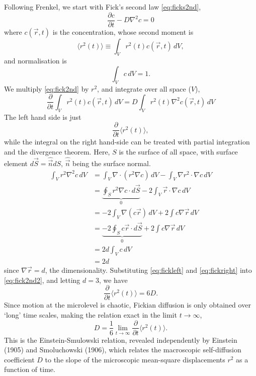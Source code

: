 \documentclass[11pt,bibliography=totoc,index=totoc]{scrbook}   %
\begin{document}
Following Frenkel\cite[78-79]{Frenkel:1996}, we start with Fick's second law \eqref{eq:ficks2nd}, 
\begin{equation}
    \frac{\partial c}{\partial t} - D\nabla^2c = 0
  \label{eq:fick2nd}
\end{equation}
where $c(\vec{r},t)$ is the concentration, whose second moment is
\begin{equation}
    \langle r^2(t)\rangle \equiv \int_V r^2(t) c(\vec{r},t) \,dV,
  \label{eq:secondmom}
\end{equation}
and normalisation is
\begin{equation}
    \int_V c\,dV = 1.
  \label{eq:cnorm}
\end{equation}
We multiply \eqref{eq:fick2nd} by $r^2$, and integrate over all space ($V$),
\begin{equation}
    \frac{\partial}{\partial t} \int_V r^2(t) c(\vec{r},t)\,dV = D\int_V r^2(t) \nabla^2 c(\vec{r},t) \,dV
  \label{eq:fick2nd2}
\end{equation}
The left hand side is just
\begin{equation}
  \frac{\partial}{\partial t} \langle r^2(t)\rangle,
  \label{eq:fickleft}
\end{equation}
while the integral on the right hand-side can be treated with partial integration and the divergence theorem.
Here, $S$ is the surface of all space, with surface element $d\vec{S}=\hat{\vec{n}}dS$, $\hat{\vec{n}}$ being the surface normal.
\begin{align}
  \int_V r^2 \nabla^2 c \,dV &= \int_V \nabla\cdot (r^2\nabla c) \,dV - \int_V \nabla r^2 \cdot \nabla c \, dV \nonumber\\
  &= \underbrace{\oint_S r^2 \nabla c \cdot d\vec{S}}_0 - 2\int_V \vec{r}\cdot\nabla c \,dV \nonumber\\
  &= -2\int_V \nabla (c\vec{r}) \,dV + 2 \int c \nabla \vec{r} \, dV \nonumber\\
  &= \underbrace{-2\oint_S c\vec{r}\cdot d\vec{S}}_0 + 2 \int c \nabla \vec{r} \, dV \nonumber\\
  &= 2d\int_V c \, dV \nonumber\\
  &= 2d \label{eq:fickright}
\end{align}
since $\nabla\vec{r} = d$, the dimensionality. 
Substituting \eqref{eq:fickleft} and \eqref{eq:fickright} into \eqref{eq:fick2nd2}, and letting $d=3$, we have
\begin{equation}
  \frac{\partial}{\partial t} \langle r^2(t)\rangle = 6D.
\end{equation}
Since motion at the microlevel is chaotic, Fickian diffusion is only obtained over `long' time scales, 
making the relation exact in the limit $t\to\infty$,
\begin{equation}
    D = \frac{1}{6}\lim_{t\to\infty} \frac{\partial}{\partial t} \langle r^2(t)\rangle.
\end{equation}
This is the Einstein-Smulowski relation, revealed independently by Einstein (1905)\cite{Einstein:1905}
and Smoluchowski (1906),\cite{Smoluchowski:1906}
which relates the macroscopic self-diffusion coefficient $D$ to the slope of the microscopic mean-square displacements $r^2$ as a function of time.
\end{document}
